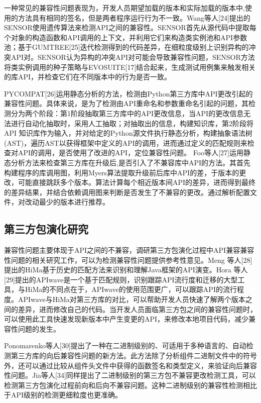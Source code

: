 一种常见的兼容性问题表现为，开发人员期望加载的版本和实际加载的版本中,使用的方法具有相同的签名，但是两者程序运行行为不一致。Wang等人[24]提出的SENSOR使用遗传算法来检测API之间的兼容性。SENSOR首先从源代码中提取每个对象的构造函数和API调用的上下文，并利用它们来构造类实例池和API参数池；基于GUMTREE[25]迭代检测得到的代码差异，在细粒度级别上识别异构的冲突API对。SENSOR认为异构的冲突API对可能会导致兼容性问题，SENSOR方法将类实例调用的种子策略与EVOSUITE[17]结合起来，生成测试用例集来触发相关的库API，并检查它们在不同版本中的行为是否一致。

PYCOMPAT[26]运用静态分析的方法，检测由Python第三方库中API更改引起的兼容性问题。具体来说，是为了检测由API重命名和参数重命名引起的问题，其检测分为两个阶段：第1阶段抽取第三方库中的API更改信息，当API的更改信息无法进行自动化抽取时，采用人工抽取；对抽取出的信息，构建知识库，第2阶段将 API 知识库作为输入，并对给定的Python源文件执行静态分析，构建抽象语法树(AST)，遍历AST以获得框架中定义的API的调用，进而通过定义的匹配规则来检查对API的调用，是否使用了改进的API，定位兼容性问题。
Foo等人[27]运用静态分析方法来检查第三方库在升级后,是否引入了不兼容库中API的方法。其首先构建程序的库调用图，利用Myers算法提取升级前后库中API的差，于版本的更改，可能直接跳跃多个版本。算法计算每个相近版本间API的差异，进而得到最终的差异结果，并结合依赖调用图来判断是否发生了不兼容的更改。通过解析配置文件，对改动最少的版本进行推荐。
\subsection{第三方包演化研究}
兼容性问题主要体现于API之间的不兼容，调研第三方包演化过程中API兼容兼容性问题的相关研究工作，可以为检测兼容性问题提供参考性意见。Meng 等人[28]提出的HiMa基于历史的匹配方法来识别和理解Java框架的API演变。Hora 等人[29]提出的APIwave是一个基于匹配规则，识别跟踪API流行度和迁移的大型工具，与HiMa的不同点在于，APIwave的使用范围更广，可以跟踪API的流行程度。APIwave与HiMa对第三方库的对比，可以帮助开发人员快速了解两个版本之间的差异，进而修改自己的代码。当开发人员面临第三方包之间的兼容性问题时，可以使用此工具快速发现新版本中产生变更的API，来修改本地项目代码，减少兼容性问题的发生。

Ponomarenko等人[30]提出了一种在二进制级别的、可适用于多种语言的、自动检测第三方库的向后兼容性问题的新方法。此方法除了分析组件二进制文件中的符号外，还可以通过比较从组件头文件中获得的函数签名和类型定义，来验证向后兼容性问题。Jia等人[34]同样提出了二进制级别的第三方包不兼容更改检测工具，可以检测第三方包演化过程前向和后向不兼容问题。这种二进制级别的兼容性检测相比于API级别的检测更细粒度也更准确。

